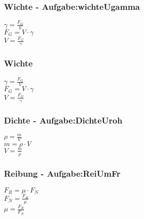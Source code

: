 \subsubsection{Wichte - Aufgabe:wichteUgamma} 
\begin{minipage}{0.45\textwidth} 
$ \gamma  = \frac{F_{G} }{V} $\\ 
$ F_{G}  = V\cdot \gamma $\\ 
$ V = \frac{F_{G} }{\gamma } $\\ 
\end{minipage} 
\begin{minipage}{0.45\textwidth} 
 
\end{minipage} 
\subsubsection{Wichte} 
\begin{minipage}{0.45\textwidth} 
$ \gamma  = \frac{F_{G} }{V} $\\ 
$ F_{G}  = V\cdot \gamma $\\ 
$ V = \frac{F_{G} }{\gamma } $\\ 
\end{minipage} 
\begin{minipage}{0.45\textwidth} 
 
\end{minipage} 
\subsubsection{Dichte - Aufgabe:DichteUroh} 
\begin{minipage}{0.45\textwidth} 
$ \rho  = \frac{m}{V} $\\ 
$ m = \rho \cdot V $\\ 
$ V = \frac{m}{\rho } $\\ 
\end{minipage} 
\begin{minipage}{0.45\textwidth} 
 
\end{minipage} 
\subsubsection{Reibung - Aufgabe:ReiUmFr} 
\begin{minipage}{0.45\textwidth} 
$ F_{R}  = \mu \cdot F_{N} $\\ 
$ F_{N}  = \frac{F_{R} }{\mu } $\\ 
$ \mu  = \frac{F_{R} }{F_{N} } $\\ 
\end{minipage} 
\begin{minipage}{0.45\textwidth} 
 
\end{minipage} 
